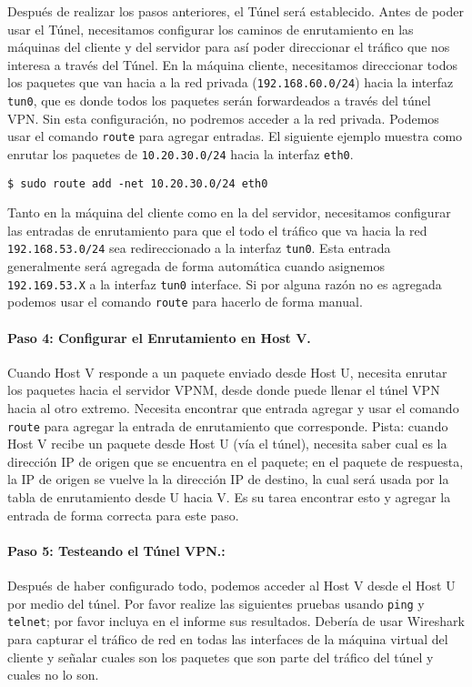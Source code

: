 Después de realizar los pasos anteriores, el Túnel será establecido.
Antes de poder usar el Túnel, necesitamos configurar los caminos de enrutamiento en las máquinas del cliente y del servidor para así poder direccionar el tráfico que nos interesa a través del Túnel.
En la máquina cliente, necesitamos direccionar todos los paquetes que van hacia a la red privada ({\tt 192.168.60.0/24}) hacia la interfaz  \texttt{tun0}, que es donde todos los paquetes serán forwardeados a través del túnel VPN.
Sin esta configuración, no podremos acceder a la red privada.
Podemos usar el comando \texttt{route} para agregar entradas. El siguiente ejemplo muestra como enrutar los paquetes de \texttt{10.20.30.0/24} hacia la interfaz \texttt{eth0}.

\begin{lstlisting}
$ sudo route add -net 10.20.30.0/24 eth0
\end{lstlisting}

Tanto en la máquina del cliente como en la del servidor, necesitamos configurar las entradas de enrutamiento para que el todo el tráfico  que va hacia la red \texttt{192.168.53.0/24} sea redireccionado a la interfaz \texttt{tun0}. Esta entrada generalmente será agregada de forma automática cuando asignemos \texttt{192.169.53.X} a la interfaz \texttt{tun0} interface. Si por alguna razón no es agregada podemos usar el comando \texttt{route} para hacerlo de forma manual.



\paragraph{Paso 4: Configurar el Enrutamiento en Host V.} 
Cuando Host V responde a un paquete enviado desde Host U, necesita enrutar los paquetes hacia el servidor VPNM, desde donde puede llenar el túnel VPN hacia al otro extremo. Necesita encontrar que entrada agregar y usar el comando \texttt{route} para agregar la entrada de enrutamiento que corresponde.
Pista: cuando Host V recibe un paquete desde Host U (vía el túnel), necesita saber cual es la dirección IP de origen que se encuentra en el paquete; en el paquete de respuesta, la IP de origen se vuelve la la dirección IP de destino, la cual será usada por la tabla de enrutamiento desde U hacia V. Es su tarea encontrar esto y agregar la entrada de forma correcta para este paso.

\paragraph{Paso 5: Testeando el Túnel VPN.:} 
Después de haber configurado todo, podemos acceder al Host V desde el Host U por medio del túnel.
Por favor realize las siguientes pruebas usando \texttt{ping} y \texttt{telnet}; por favor incluya en el informe sus resultados. Debería de usar Wireshark para capturar el tráfico de red en todas las interfaces de la máquina virtual del cliente y señalar cuales son los paquetes que son parte del tráfico del túnel y cuales no lo son.

